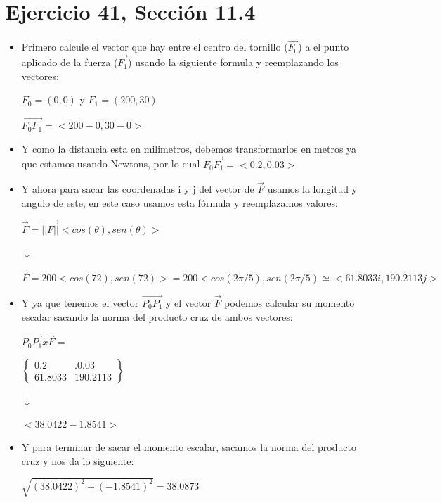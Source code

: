 \documentclass[11pt,letterpaper]{article}
\begin{document}
\section{Ejercicio 41, Sección 11.4}

\begin{itemize}
    
    \item Primero calcule el vector que hay entre el centro del tornillo ($\vec{F_0}$) a el punto aplicado de la fuerza ($\vec{F_1}$) usando la siguiente formula y reemplazando los vectores:
    \begin{center}
        $F_0 = (0,0)$ y $F_1 = (200, 30)$
        
        $\vec{F_0 F_1} = <200 - 0, 30 - 0>$
    \end{center}
    \item Y como la distancia esta en milimetros, debemos transformarlos en metros ya que estamos usando Newtons, por lo cual $\vec{F_0 F_1} = <0.2, 0.03>$
    \item Y ahora para sacar las coordenadas i y j del vector de $\vec{F}$ usamos la longitud y angulo de este, en este caso usamos esta fórmula y reemplazamos valores:
    \begin{center}
        $\vec{F} = \vec{||F||}<cos(\theta), sen(\theta)>$
        
        $\downarrow$
    
        $\vec{F} = 200<cos(72), sen(72)> = 200<cos(2\pi/5), sen(2\pi/5) \simeq <61.8033 i, 190.2113 j>$ 
        
    \end{center}
    \item Y ya que tenemos el vector $\vec{P_0 P_1}$ y el vector $\vec{F}$ podemos calcular su momento escalar sacando la norma del producto cruz de ambos vectores:
    \begin{center}
        $\vec{P_0 P_1} x \vec{F} = $
        
        $\begin{Bmatrix}
            0.2 & .0.03\\
            61.8033 & 190.2113
        \end{Bmatrix}$
        
    
        $\downarrow$
    
        $<38.0422 - 1.8541> $    
    \end{center}
    \item Y para terminar de sacar el momento escalar, sacamos la norma del producto cruz y nos da lo siguiente:
    \begin{center}
        $\sqrt{(38.0422)^{2} + (-1.8541)^{2}} = 38.0873 $
    \end{center}
\end{itemize}
\end{document}
